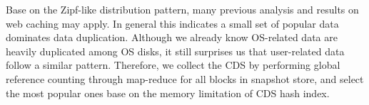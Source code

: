 
Base on the Zipf-like distribution pattern, many previous analysis and results on web caching may apply.
In general this indicates a small set of popular data dominates data duplication.
Although we already know OS-related data are heavily duplicated among OS disks, 
it still surprises us that user-related data follow a similar pattern.
Therefore, we collect the CDS by performing global reference counting through map-reduce for all
blocks in snapshot store, and select the most popular ones base on the memory limitation of
CDS hash index. 

